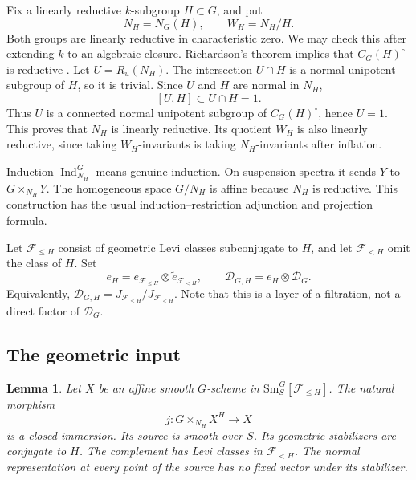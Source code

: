 \documentclass[11pt,reqno]{amsart}
\newtheorem{lemma}[theorem]{Lemma}
\theoremstyle{definition}
\theoremstyle{remark}
\theoremstyle{plain}
\numberwithin{equation}{section}
\newcommand{\Sm}{\mathrm{Sm}}
\newcommand{\D}{\mathcal D}
\newcommand{\F}{\mathcal F}
\begin{document}
Fix a linearly reductive \(k\)-subgroup \(H\subset G\), and put
\[
 N_H=N_G(H),\qquad W_H=N_H/H.
\]
Both groups are linearly reductive in characteristic zero.
We may check this after extending \(k\) to an algebraic closure.
Richardson's theorem implies that \(C_G(H)^\circ\) is reductive
\cite[Proposition~10.1.5]{RichardsonOrbits}.
Let \(U=R_u(N_H)\).
The intersection \(U\cap H\) is a normal unipotent subgroup of \(H\),
so it is trivial. Since \(U\) and \(H\) are normal in \(N_H\),
\[
 [U,H]\subset U\cap H=1.
\]
Thus \(U\) is a connected normal unipotent subgroup of
\(C_G(H)^\circ\), hence \(U=1\).
This proves that \(N_H\) is linearly reductive.
Its quotient \(W_H\) is also linearly reductive, since taking
\(W_H\)-invariants is taking \(N_H\)-invariants after inflation.

Induction \(\operatorname{Ind}_{N_H}^G\) means genuine induction.
On suspension spectra it sends \(Y\) to \(G\times_{N_H}Y\).
The homogeneous space \(G/N_H\) is affine because \(N_H\)
is reductive.
This construction has the usual induction--restriction
adjunction and projection formula.

Let \(\F_{\leq H}\) consist of geometric Levi classes subconjugate
to \(H\), and let \(\F_{<H}\) omit the class of \(H\).
Set
\[
 e_H=e_{\F_{\leq H}}\otimes\widetilde e_{\F_{<H}},
 \qquad
 \D_{G,H}=e_H\otimes\D_G.
\]
Equivalently,
\(\D_{G,H}=J_{\F_{\leq H}}/J_{\F_{<H}}\).
Note that this is a layer of a filtration, not a direct factor of \(\D_G\).

\subsection{The geometric input}

\begin{lemma}\label{lem:affine-maximal-locus}
Let \(X\) be an affine smooth \(G\)-scheme in
\(\Sm^G_S[\F_{\leq H}]\).
The natural morphism
\[
 j:G\times_{N_H}X^H\longrightarrow X
\]
is a closed immersion.
Its source is smooth over \(S\).
Its geometric stabilizers are conjugate to \(H\).
The complement has Levi classes in \(\F_{<H}\).
The normal representation at every point of the source has no
fixed vector under its stabilizer.
\end{lemma}
\end{document}
